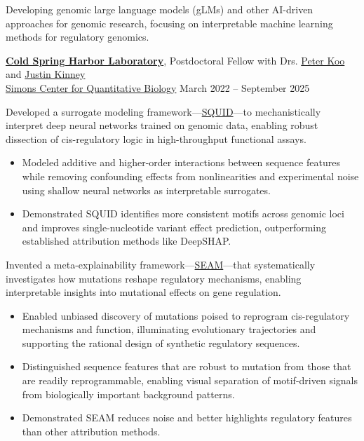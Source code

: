 \documentclass[11pt]{article}
\begin{document}
\small{
Developing genomic large language models (gLMs) and other AI-driven approaches for genomic research, focusing on interpretable machine learning methods for regulatory genomics.
}

\textbf{\href{https://www.cshl.edu/}{Cold Spring Harbor Laboratory}}, Postdoctoral Fellow with Drs. \href{https://www.cshl.edu/research/faculty-staff/peter-koo/}{Peter Koo} and \href{https://www.cshl.edu/research/faculty-staff/justin-kinney/}{Justin Kinney}\\
\href{https://www.cshl.edu/research/quantitative-biology/}{Simons Center for Quantitative Biology} \hfill March 2022 – September 2025

\small{
Developed a surrogate modeling framework—\href{https://github.com/evanseitz/squid-nn}{SQUID}—to mechanistically interpret deep neural networks trained on genomic data, enabling robust dissection of cis-regulatory logic in high-throughput functional assays.

    \begin{itemize}
        \item Modeled additive and higher-order interactions between sequence features while removing confounding effects from nonlinearities and experimental noise using shallow neural networks as interpretable surrogates.
        \item Demonstrated SQUID identifies more consistent motifs across genomic loci and improves single-nucleotide variant effect prediction, outperforming established attribution methods like DeepSHAP.
    \end{itemize}

Invented a meta-explainability framework—\href{https://github.com/evanseitz/seam-nn}{SEAM}—that systematically investigates how mutations reshape regulatory mechanisms, enabling interpretable insights into mutational effects on gene regulation.

    \begin{itemize}
        \item Enabled unbiased discovery of mutations poised to reprogram cis-regulatory mechanisms and function, illuminating evolutionary trajectories and supporting the rational design of synthetic regulatory sequences.
        \item Distinguished sequence features that are robust to mutation from those that are readily reprogrammable, enabling visual separation of motif-driven signals from biologically important background patterns.
        \item Demonstrated SEAM reduces noise and better highlights regulatory features than other attribution methods.
    \end{itemize}
}
\end{document}
